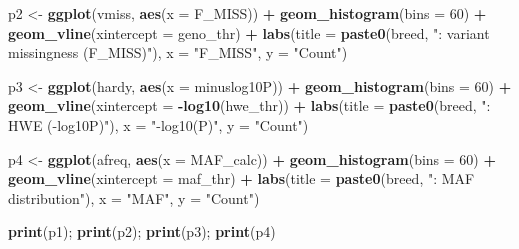 \documentclass[
]{article}
\newenvironment{Shaded}{\begin{snugshade}}{\end{snugshade}}
\newcommand{\AttributeTok}[1]{\textcolor[rgb]{0.13,0.29,0.53}{#1}}
\newcommand{\DecValTok}[1]{\textcolor[rgb]{0.00,0.00,0.81}{#1}}
\newcommand{\FunctionTok}[1]{\textcolor[rgb]{0.13,0.29,0.53}{\textbf{#1}}}
\newcommand{\NormalTok}[1]{#1}
\newcommand{\OtherTok}[1]{\textcolor[rgb]{0.56,0.35,0.01}{#1}}
\newcommand{\SpecialCharTok}[1]{\textcolor[rgb]{0.81,0.36,0.00}{\textbf{#1}}}
\newcommand{\StringTok}[1]{\textcolor[rgb]{0.31,0.60,0.02}{#1}}
\begin{document}
\begin{Shaded}
\begin{Highlighting}[]
\NormalTok{  p2 }\OtherTok{\textless{}{-}} \FunctionTok{ggplot}\NormalTok{(vmiss, }\FunctionTok{aes}\NormalTok{(}\AttributeTok{x =}\NormalTok{ F\_MISS)) }\SpecialCharTok{+}
    \FunctionTok{geom\_histogram}\NormalTok{(}\AttributeTok{bins =} \DecValTok{60}\NormalTok{) }\SpecialCharTok{+}
    \FunctionTok{geom\_vline}\NormalTok{(}\AttributeTok{xintercept =}\NormalTok{ geno\_thr) }\SpecialCharTok{+}
    \FunctionTok{labs}\NormalTok{(}\AttributeTok{title =} \FunctionTok{paste0}\NormalTok{(breed, }\StringTok{": variant missingness (F\_MISS)"}\NormalTok{),}
         \AttributeTok{x =} \StringTok{"F\_MISS"}\NormalTok{, }\AttributeTok{y =} \StringTok{"Count"}\NormalTok{)}
  
\NormalTok{  p3 }\OtherTok{\textless{}{-}} \FunctionTok{ggplot}\NormalTok{(hardy, }\FunctionTok{aes}\NormalTok{(}\AttributeTok{x =}\NormalTok{ minuslog10P)) }\SpecialCharTok{+}
    \FunctionTok{geom\_histogram}\NormalTok{(}\AttributeTok{bins =} \DecValTok{60}\NormalTok{) }\SpecialCharTok{+}
    \FunctionTok{geom\_vline}\NormalTok{(}\AttributeTok{xintercept =} \SpecialCharTok{{-}}\FunctionTok{log10}\NormalTok{(hwe\_thr)) }\SpecialCharTok{+}
    \FunctionTok{labs}\NormalTok{(}\AttributeTok{title =} \FunctionTok{paste0}\NormalTok{(breed, }\StringTok{": HWE ({-}log10P)"}\NormalTok{),}
         \AttributeTok{x =} \StringTok{"{-}log10(P)"}\NormalTok{, }\AttributeTok{y =} \StringTok{"Count"}\NormalTok{)}
  
\NormalTok{  p4 }\OtherTok{\textless{}{-}} \FunctionTok{ggplot}\NormalTok{(afreq, }\FunctionTok{aes}\NormalTok{(}\AttributeTok{x =}\NormalTok{ MAF\_calc)) }\SpecialCharTok{+}
    \FunctionTok{geom\_histogram}\NormalTok{(}\AttributeTok{bins =} \DecValTok{60}\NormalTok{) }\SpecialCharTok{+}
    \FunctionTok{geom\_vline}\NormalTok{(}\AttributeTok{xintercept =}\NormalTok{ maf\_thr) }\SpecialCharTok{+}
    \FunctionTok{labs}\NormalTok{(}\AttributeTok{title =} \FunctionTok{paste0}\NormalTok{(breed, }\StringTok{": MAF distribution"}\NormalTok{),}
         \AttributeTok{x =} \StringTok{"MAF"}\NormalTok{, }\AttributeTok{y =} \StringTok{"Count"}\NormalTok{)}
  
  \FunctionTok{print}\NormalTok{(p1); }\FunctionTok{print}\NormalTok{(p2); }\FunctionTok{print}\NormalTok{(p3); }\FunctionTok{print}\NormalTok{(p4)}
  

\end{Highlighting}
\end{Shaded}
\end{document}
